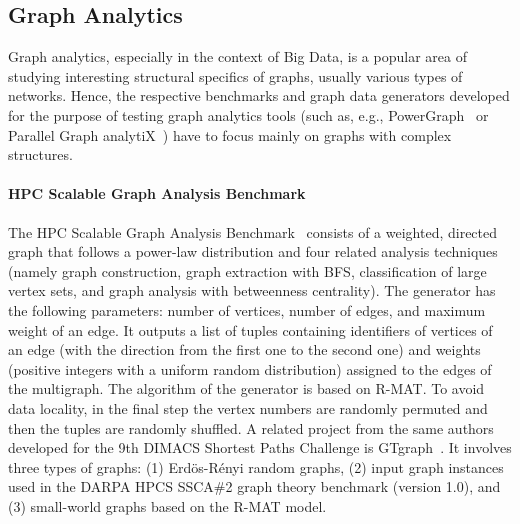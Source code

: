 \subsection{Graph Analytics}
\label{sec:generators_analytics}

Graph analytics, especially in the context of Big Data, is a popular area of studying interesting structural specifics of graphs, usually various types of networks.  Hence, the respective benchmarks and graph data generators developed for the purpose of testing graph analytics tools (such as, e.g.,  PowerGraph~\cite{Gonzalez:2012:PDG:2387880.2387883} or Parallel Graph analytiX~\cite{Sevenich:2016:UDL:3007263.3007265}) have to focus mainly on graphs with complex structures.

\paragraph{HPC Scalable Graph Analysis Benchmark} The HPC Scalable Graph Analysis Benchmark~\cite{HPCgraph,Bader:2005:DIH:2099301.2099360} consists of a weighted, directed graph that follows a power-law distribution and four related analysis techniques (namely graph construction, graph extraction with BFS, classification of large vertex sets, and graph analysis with betweenness centrality). The generator has the following parameters: number of vertices, number of edges, and maximum weight of an edge. It outputs a list of tuples containing identifiers of vertices of an edge (with the direction from the first one to the second one) and weights (positive integers  with a uniform random distribution) assigned to the edges of the multigraph.  The algorithm of the generator is based on R-MAT. To avoid data locality, in the final step the vertex numbers are randomly permuted and then the tuples are randomly shuffled. A related project from the same authors developed for the 9th DIMACS Shortest Paths Challenge is GTgraph~\cite{GTgraph}. It involves three types of graphs: (1) Erd\"{o}s-R\'{e}nyi random graphs, (2) input graph instances used in the DARPA HPCS SSCA\#2 graph theory benchmark (version 1.0), and (3) small-world graphs based on the R-MAT model.

